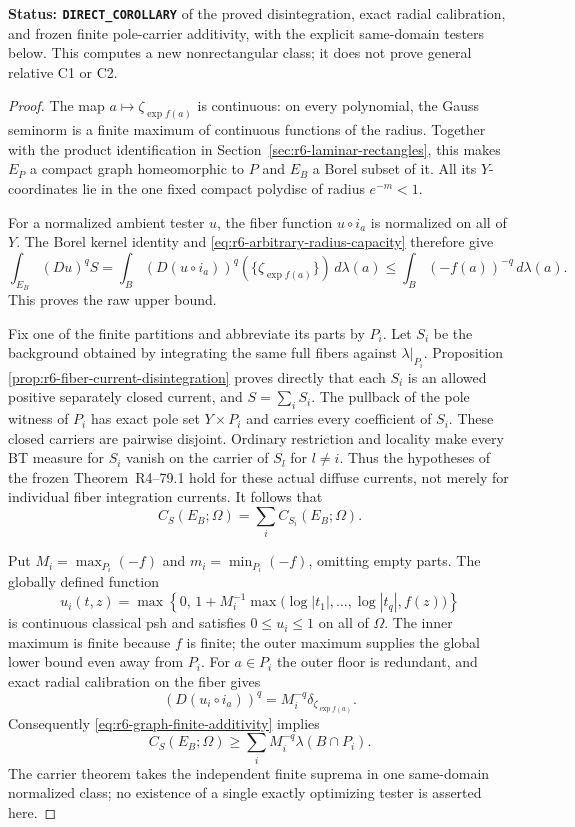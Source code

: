 \documentclass[11pt,a4paper]{article}
\numberwithin{equation}{section}
\theoremstyle{definition}
\theoremstyle{remark}
\begin{document}
\noindent\textbf{Status: \texttt{DIRECT\_COROLLARY}} of the proved
disintegration, exact radial calibration, and frozen finite pole-carrier
additivity, with the explicit same-domain testers below. This computes
a new nonrectangular class; it does not prove general relative C1 or C2.

\begin{proof}
The map $a\mapsto\zeta_{\exp f(a)}$ is continuous: on every polynomial,
the Gauss seminorm is a finite maximum of continuous functions of the
radius. Together with the product identification in
Section~\ref{sec:r6-laminar-rectangles}, this makes $E_P$ a compact
graph homeomorphic to $P$ and $E_B$ a Borel subset of it. All its
$Y$-coordinates lie in the one fixed compact polydisc of radius
$e^{-m}<1$.

For a normalized ambient tester $u$, the fiber function $u\circ i_a$
is normalized on all of $Y$. The Borel kernel identity and
\eqref{eq:r6-arbitrary-radius-capacity} therefore give
\[
 \int_{E_B}(Du)^qS
  =\int_B (D(u\circ i_a))^q(\{\zeta_{\exp f(a)}\})\,d\lambda(a)
  \le\int_B(-f(a))^{-q}\,d\lambda(a).
\]
This proves the raw upper bound.

Fix one of the finite partitions and abbreviate its parts by $P_i$.
Let $S_i$ be the background obtained by integrating the same full
fibers against $\lambda|_{P_i}$. Proposition
\ref{prop:r6-fiber-current-disintegration} proves directly that each
$S_i$ is an allowed positive separately closed current, and
$S=\sum_iS_i$. The pullback of the pole witness of $P_i$ has exact
pole set $Y\times P_i$ and carries every coefficient of $S_i$.
These closed carriers are pairwise disjoint. Ordinary restriction and
locality make every BT measure for $S_i$ vanish on the carrier of
$S_l$ for $l\ne i$. Thus the hypotheses of the frozen
Theorem~\textup{R4--79.1} hold for these actual
diffuse currents, not merely for individual fiber integration currents.
It follows that
\begin{equation}
                       C_S(E_B;\Omega)=\sum_i C_{S_i}(E_B;\Omega).
 \label{eq:r6-graph-finite-additivity}
\end{equation}

Put $M_i=\max_{P_i}(-f)$ and $m_i=\min_{P_i}(-f)$, omitting empty
parts. The globally defined function
\[
 u_i(t,z)=\max\left\{0,\,1+M_i^{-1}
               \max\big(\log|t_1|,\ldots,\log|t_q|,f(z)\big)\right\}
\]
is continuous classical psh and satisfies $0\le u_i\le1$ on all of
$\Omega$. The inner maximum is finite because $f$ is finite; the
outer maximum supplies the global lower bound even away from $P_i$.
For $a\in P_i$ the outer floor is redundant, and exact radial
calibration on the fiber gives
\[
                   (D(u_i\circ i_a))^q
                              =M_i^{-q}\delta_{\zeta_{\exp f(a)}}.
\]
Consequently \eqref{eq:r6-graph-finite-additivity} implies
\begin{equation}
                    C_S(E_B;\Omega)
                         \ge\sum_i M_i^{-q}\lambda(B\cap P_i).
 \label{eq:r6-graph-lower-sum}
\end{equation}
The carrier theorem takes the independent finite suprema in one
same-domain normalized class; no existence of a single exactly
optimizing tester is asserted here.


\end{proof}
\end{document}
